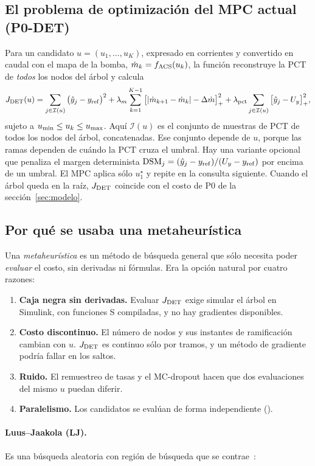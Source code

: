 \subsection{El problema de optimización del MPC actual (P0-DET)}
Para un candidato $u=(u_1,\dots,u_K)$, expresado en corrientes y convertido en caudal con el
mapa de la bomba, $\dot m_k=f_{\rm ACS}(u_k)$, la función  reconstruye la
PCT de \emph{todos} los nodos del árbol y calcula
\[
J_{\rm DET}(u)=\sum_{j\in\mathcal I(u)}\big(\hat y_j-y_{\rm ref}\big)^2
+\lambda_m\sum_{k=1}^{K-1}\big[|\dot m_{k+1}-\dot m_k|-\Delta\dot m\big]_+^2
+\lambda_{\rm pct}\sum_{j\in\mathcal I(u)}\big[\hat y_j-U_y\big]_+^2,
\]
sujeto a $u_{\rm min}\le u_k\le u_{\rm max}$. Aquí $\mathcal I(u)$ es el conjunto de muestras de
PCT de todos los nodos del árbol, concatenadas. Ese conjunto depende de $u$, porque las ramas
dependen de cuándo la PCT cruza el umbral. Hay una variante opcional que penaliza el margen
determinista $\mathrm{DSM}_j=(\hat y_j-y_{\rm ref})/(U_y-y_{\rm ref})$ por encima de un umbral.
El MPC aplica sólo $u_1^\star$ y repite en la consulta siguiente. Cuando el árbol queda en la
raíz, $J_{\rm DET}$ coincide con el costo de P0 de la sección~\ref{sec:modelo}.

\subsection{Por qué se usaba una metaheurística}
Una \emph{metaheurística} es un método de búsqueda general que sólo necesita poder
\emph{evaluar} el costo, sin derivadas ni fórmulas. Era la opción natural por cuatro razones:
\begin{enumerate}
  \item \textbf{Caja negra sin derivadas.} Evaluar $J_{\rm DET}$ exige simular el árbol en
        Simulink, con funciones S compiladas, y no hay gradientes disponibles.
  \item \textbf{Costo discontinuo.} El número de nodos y sus instantes de ramificación cambian
        con $u$. $J_{\rm DET}$ es continuo sólo por tramos, y un método de gradiente podría
        fallar en los saltos.
  \item \textbf{Ruido.} El remuestreo de tasas y el MC-dropout hacen que dos evaluaciones del
        mismo $u$ puedan diferir.
  \item \textbf{Paralelismo.} Los candidatos se evalúan de forma independiente
        ().
\end{enumerate}

\paragraph{Luus--Jaakola (LJ).} Es una búsqueda aleatoria con región de búsqueda que se
contrae~\cite{luus1973}:

